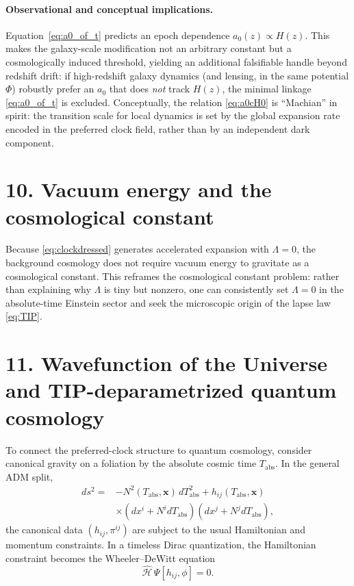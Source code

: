 \documentclass[12pt]{article}
\begin{document}
\paragraph{Observational and conceptual implications.}
Equation~\eqref{eq:a0_of_t} predicts an epoch dependence $a_{0}(z)\propto H(z)$.
This makes the galaxy-scale modification not an arbitrary constant but a cosmologically induced threshold, yielding an additional falsifiable handle beyond redshift drift: if high-redshift galaxy dynamics (and lensing, in the same potential $\Phi$) robustly prefer an $a_{0}$ that does \emph{not} track $H(z)$, the minimal linkage \eqref{eq:a0_of_t} is excluded.
Conceptually, the relation \eqref{eq:a0cH0} is ``Machian'' in spirit: the transition scale for local dynamics is set by the global expansion rate encoded in the preferred clock field, rather than by an independent dark component.

\section*{10. Vacuum energy and the cosmological constant}
Because \eqref{eq:clockdressed} generates accelerated expansion with $\Lambda=0$, the background cosmology does not require vacuum energy to gravitate as a cosmological constant. This reframes the cosmological constant problem: rather than explaining why $\Lambda$ is tiny but nonzero, one can consistently set $\Lambda=0$ in the absolute-time Einstein sector and seek the microscopic origin of the lapse law \eqref{eq:TIP}.

\section*{11. Wavefunction of the Universe and TIP-deparametrized quantum cosmology}

To connect the preferred-clock structure to quantum cosmology, consider canonical
gravity on a foliation by the absolute cosmic time $T_{\mathrm{abs}}$. In the general
ADM split,
\begin{equation}
\begin{aligned}
ds^{2} ={}& -N^{2}(T_{\mathrm{abs}},\mathbf{x})\, dT_{\mathrm{abs}}^{2}
+ h_{ij}(T_{\mathrm{abs}},\mathbf{x}) \\
&\times \left(dx^{i} + N^{i} dT_{\mathrm{abs}}\right)
\left(dx^{j} + N^{j} dT_{\mathrm{abs}}\right),
\end{aligned}
\label{eq:ADM}
\end{equation}
the canonical data $(h_{ij},\pi^{ij})$ are subject to the usual Hamiltonian and
momentum constraints. In a timeless Dirac quantization, the Hamiltonian constraint
becomes the Wheeler--DeWitt equation
\begin{equation}
\hat{\mathcal{H}}\,\Psi[h_{ij},\phi] = 0 .
\end{equation}
\end{document}
